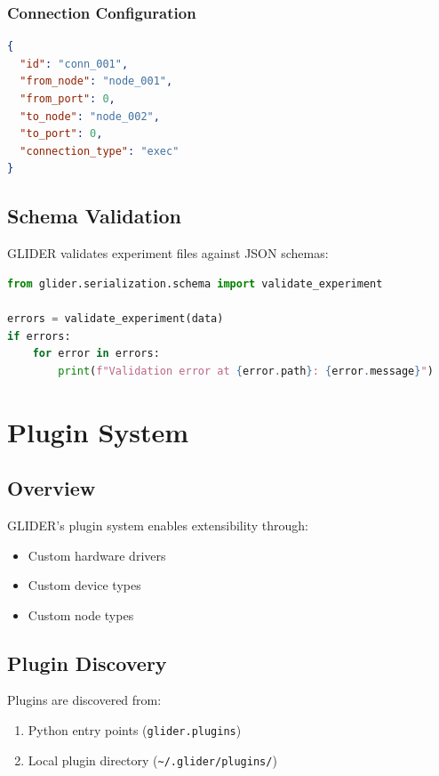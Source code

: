 \documentclass[11pt,a4paper]{article}
\begin{document}
\subsubsection{Connection Configuration}

\begin{lstlisting}[language=json]
{
  "id": "conn_001",
  "from_node": "node_001",
  "from_port": 0,
  "to_node": "node_002",
  "to_port": 0,
  "connection_type": "exec"
}
\end{lstlisting}

\subsection{Schema Validation}

GLIDER validates experiment files against JSON schemas:

\begin{lstlisting}[language=Python]
from glider.serialization.schema import validate_experiment

errors = validate_experiment(data)
if errors:
    for error in errors:
        print(f"Validation error at {error.path}: {error.message}")
\end{lstlisting}

\section{Plugin System}

\subsection{Overview}

GLIDER's plugin system enables extensibility through:
\begin{itemize}    \item Custom hardware drivers
    \item Custom device types
    \item Custom node types
\end{itemize}

\subsection{Plugin Discovery}

Plugins are discovered from:
\begin{enumerate}    \item Python entry points (\texttt{glider.plugins})
    \item Local plugin directory (\texttt{\~{}/.glider/plugins/})
\end{enumerate}
\end{document}

